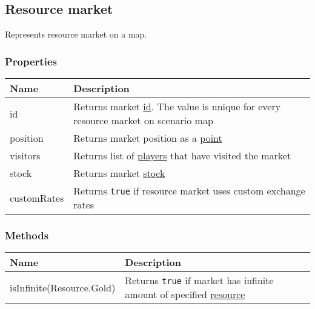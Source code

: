 \subsection{Resource market}
\label{ResourceMarket}
Represents resource market on a map.
\subsubsection{Properties}
\begin{center}
\begin{tabularx}{\linewidth}{| l | X |}
\hline
\textbf{Name} & \textbf{Description} \\
\hline
id & Returns market \hyperref[Id]{id}. The value is unique for every resource market on scenario map\\
\hline
position & Returns market position as a \hyperref[Point]{point}\\
\hline
visitors & Returns list of \hyperref[Player]{players} that have visited the market\\
\hline
stock & Returns market \hyperref[Currency]{stock}\\
\hline
customRates & Returns \texttt{true} if resource market uses custom exchange rates\\
\hline
\end{tabularx}
\end{center}

\subsubsection{Methods}
\begin{center}
\begin{tabularx}{\linewidth}{| l | X |}
\hline
\textbf{Name} & \textbf{Description} \\
\hline
isInfinite(Resource.Gold) & Returns \texttt{true} if market has infinite amount of specified \hyperref[Resource]{resource}\\
\hline
\end{tabularx}
\end{center}